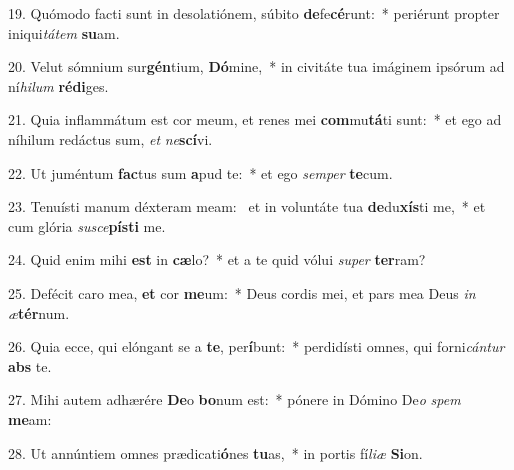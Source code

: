 19. Quómodo facti sunt in desolatiónem, súbito \textbf{de}fe\textbf{cé}runt:~*  periérunt propter iniqui\textit{tá}\textit{tem} \textbf{su}am.\

20. Velut sómnium sur\textbf{gén}tium, \textbf{Dó}mine,~*  in civitáte tua imáginem ipsórum ad ní\textit{hi}\textit{lum} \textbf{réd}\textbf{i}ges.\

21. Quia inflammátum est cor meum, et renes mei \textbf{com}mu\textbf{tá}ti sunt:~*  et ego ad níhilum redáctus sum, \textit{et} \textit{ne}\textbf{scí}vi.\

22. Ut juméntum \textbf{fac}tus sum \textbf{a}pud te:~*  et ego \textit{sem}\textit{per} \textbf{te}cum.\

23. Tenuísti manum déxteram meam: \dag\  et in voluntáte tua \textbf{de}du\textbf{xís}ti me,~*  et cum glória \textit{su}\textit{sce}\textbf{pís}\textbf{ti} me.\

24. Quid enim mihi \textbf{est} in \textbf{cæ}lo?~*  et a te quid vólui \textit{su}\textit{per} \textbf{ter}ram?\

25. Defécit caro mea, \textbf{et} cor \textbf{me}um:~*  Deus cordis mei, et pars mea Deus \textit{in} \textit{æ}\textbf{tér}num.\

26. Quia ecce, qui elóngant se a \textbf{te}, per\textbf{í}bunt:~*  perdidísti omnes, qui forni\textit{cán}\textit{tur} \textbf{abs} te.\

27. Mihi autem adhærére \textbf{De}o \textbf{bo}num est:~*  pónere in Dómino De\textit{o} \textit{spem} \textbf{me}am:\

28. Ut annúntiem omnes prædicati\textbf{ó}nes \textbf{tu}as,~*  in portis fí\textit{li}\textit{æ} \textbf{Si}on.\

